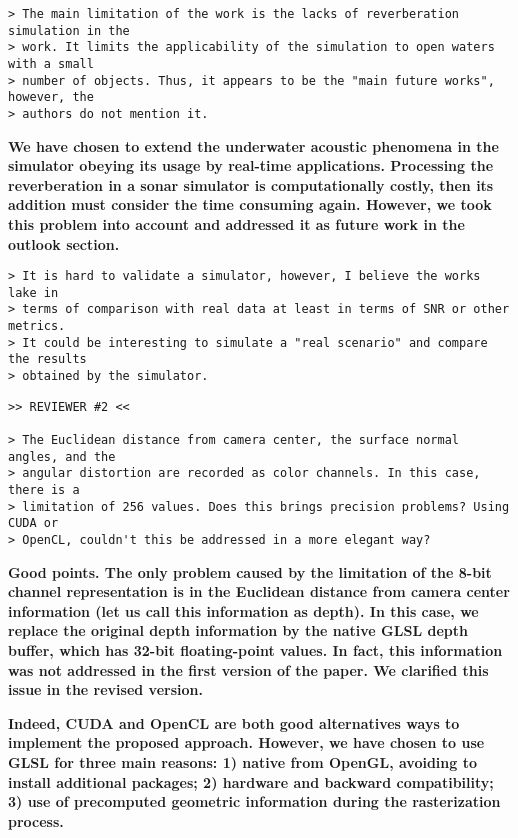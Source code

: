 \documentclass{article}
\begin{document}
\begin{verbatim}
> The main limitation of the work is the lacks of reverberation simulation in the
> work. It limits the applicability of the simulation to open waters with a small
> number of objects. Thus, it appears to be the "main future works", however, the
> authors do not mention it.
\end{verbatim}

\textbf{We have chosen to extend the underwater acoustic phenomena in the
simulator obeying its usage by real-time applications. Processing the
reverberation in a sonar simulator is computationally costly, then its
addition must consider the time consuming again. However, we took this problem
into account and addressed it as future work in the outlook section.}

\begin{verbatim}
> It is hard to validate a simulator, however, I believe the works lake in
> terms of comparison with real data at least in terms of SNR or other metrics.
> It could be interesting to simulate a "real scenario" and compare the results
> obtained by the simulator.
\end{verbatim}


\begin{verbatim}
>> REVIEWER #2 <<

> The Euclidean distance from camera center, the surface normal angles, and the
> angular distortion are recorded as color channels. In this case, there is a
> limitation of 256 values. Does this brings precision problems? Using CUDA or
> OpenCL, couldn't this be addressed in a more elegant way?
\end{verbatim}


\textbf{Good points. The only problem caused by the limitation of the 8-bit channel
representation is in the Euclidean distance from camera center information (let us call
this information as depth). In this case, we replace the original depth information by
the native GLSL depth buffer, which has 32-bit floating-point values. In fact, this
information was not addressed in the first version of the paper. We clarified this issue
in the revised version. }

\textbf{Indeed, CUDA and OpenCL are both good alternatives ways to implement
the proposed approach. However, we have chosen to use GLSL for three main reasons:
1) native from OpenGL, avoiding to install additional packages;
2) hardware and backward compatibility;
3) use of precomputed geometric information during the rasterization process.}
\end{document}
